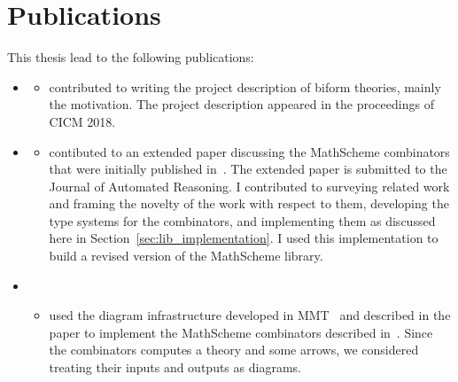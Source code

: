 \section{Publications}
This thesis lead to the following publications: 
\begin{itemize}
    \item \cite{biformCICM2018} 
        \begin{itemize}
        \item[] contributed to writing the project description of biform theories, mainly the motivation. The project description appeared in the proceedings of CICM 2018. 
        \end{itemize}
    \item \cite{carette2018building} 
    \begin{itemize} 
    \item[] contibuted to an extended paper discussing the MathScheme combinators that were initially published in~\cite{CaretteOConnorTPC}. The extended paper is submitted to the Journal of Automated Reasoning. I contributed to surveying related work and framing the novelty of the work with respect to them, developing the type systems for the combinators, and implementing them as discussed here in Section~\ref{sec:lib_implementation}. I used this implementation to build a revised version of the MathScheme library. 
   \end{itemize}
    \item ~\cite{cicm2019diagrams} 
    \begin{itemize}
    \item[] used the diagram infrastructure developed in MMT~\cite{rabe2013scalable} and described in the paper to implement the MathScheme combinators described in~\cite{carette2018building}. Since the combinators computes a theory and some arrows, we considered treating their inputs and outputs as diagrams.

\end{itemize}
\end{itemize}

